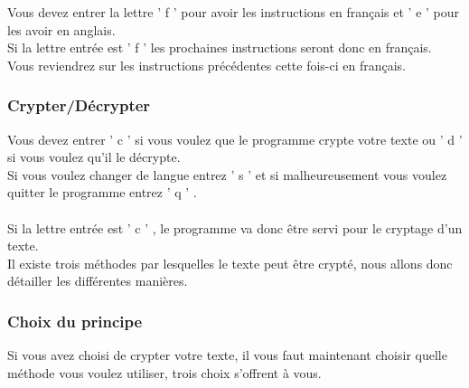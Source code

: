 \documentclass[a4paper,12pt,abstracton,titlepage]{scrartcl}
\begin{document}
Vous devez entrer la lettre ' f ' pour avoir les instructions en français et ' e ' pour les avoir en anglais.\\
Si la lettre entrée est ' f ' les prochaines instructions seront donc en français.\\
Vous reviendrez sur les instructions précédentes cette fois-ci en français.\\

\subsubsection{Crypter/Décrypter}
\vspace{0.5cm}
{
\label{FMM}
}
\vspace{0.5cm}

Vous devez entrer ' c ' si vous voulez que le programme crypte votre texte ou ' d ' si vous voulez qu'il le décrypte.\\
Si vous voulez changer de langue entrez ' s ' et si malheureusement vous voulez quitter le programme entrez ' q ' .\\
\\
Si la lettre entrée est ' c ' , le programme va donc être servi pour le cryptage d'un texte.\\
Il existe trois méthodes par lesquelles le texte peut être crypté, nous allons donc détailler les différentes manières.


\newpage
\subsubsection{Choix du principe}
Si vous avez choisi de crypter votre texte, il vous faut maintenant choisir quelle méthode vous voulez utiliser, trois choix s'offrent à vous.

\vspace{0.5cm}
{
\label{FCr}
}
\vspace{0.5cm}
\end{document}
